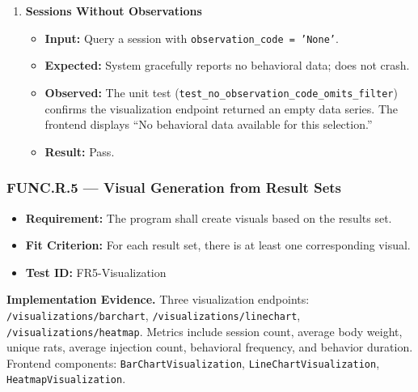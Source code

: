 \documentclass[12pt, titlepage]{article}
\begin{document}
\begin{enumerate}[label=\textbf{FR4-T\arabic*:}, leftmargin=*, labelsep=1em]
  \item \textbf{Sessions Without Observations}
  \begin{itemize}
    \item \textbf{Input:} Query a session with \texttt{observation\_code = 'None'}.
    \item \textbf{Expected:} System gracefully reports no behavioral data; does not crash.
    \item \textbf{Observed:} The unit test (\texttt{test\_\allowbreak{}no\_\allowbreak{}observation\_\allowbreak{}code\_\allowbreak{}omits\_\allowbreak{}filter}) confirms the visualization endpoint returned an empty data series. The frontend displays ``No behavioral data available for this selection.''
    \item \textbf{Result:} Pass.
  \end{itemize}

\end{enumerate}

\subsubsection{FUNC.R.5 --- Visual Generation from Result Sets}

\begin{itemize}
  \item \textbf{Requirement:} The program shall create visuals based on the results set.
  \item \textbf{Fit Criterion:} For each result set, there is at least one corresponding visual.
  \item \textbf{Test ID:} FR5-Visualization
\end{itemize}

\begin{sloppypar}
\noindent\textbf{Implementation Evidence.}
Three visualization endpoints: \texttt{/visualizations/\allowbreak{}barchart}, \texttt{/visualizations/\allowbreak{}linechart},
\texttt{/visualizations/\allowbreak{}heatmap}. Metrics include session count, average body weight, unique rats,
average injection count, behavioral frequency, and behavior duration. Frontend components:
\texttt{BarChartVisualization}, \texttt{LineChartVisualization}, \texttt{HeatmapVisualization}.
\end{sloppypar}
\end{document}
